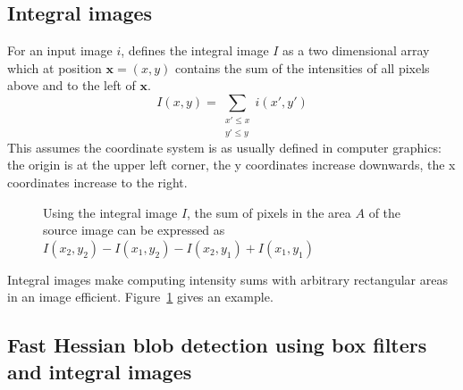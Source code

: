 \subsection{Integral images}

For an input image $i$, \cite{Viola01rapidobject} defines the integral image $I$ as a two dimensional array which at position $\mathbf{x} = (x,y)$ contains the sum of the intensities of all pixels above and to the left of $\mathbf{x}$.
\begin{equation}
I(x,y) = \sum_{\begin{smallmatrix} x' \le x \\ y' \le y\end{smallmatrix}} i(x',y')
\end{equation}
This assumes the coordinate system is as usually defined in computer graphics: the origin is at the upper left corner, the y coordinates increase downwards, the x coordinates increase to the right.

\begin{figure}
    \centering
    \caption{
        Using the integral image $I$, the sum of pixels in the area $A$ of the source image can be expressed as
        $I(x_2,y_2) -  I(x_1,y_2) - I(x_2,y_1) + I(x_1,y_1)$
        \label{fig:integral_images}
    }
\end{figure}

Integral images make computing intensity sums with arbitrary rectangular areas in an image efficient. Figure~\ref{fig:integral_images} gives an example.

\subsection{Fast Hessian blob detection using box filters and integral images}

